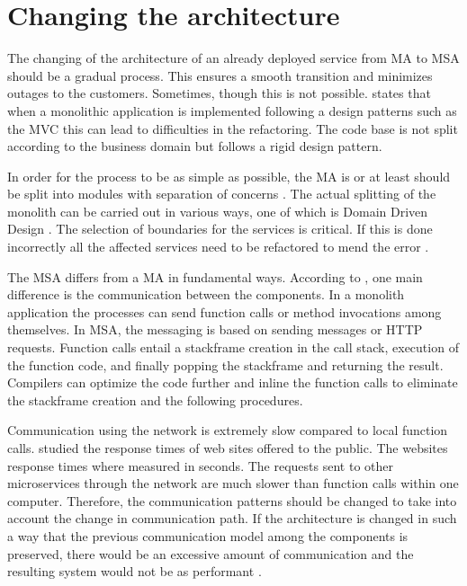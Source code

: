 \section{Changing the architecture}
\begin{sloppypar}
    The changing of the architecture of an already deployed service from MA to
    MSA should be a gradual process. This ensures a smooth transition and
    minimizes outages to the customers. Sometimes, though this is not possible.
    \citet{newman2019} states that when a monolithic application is implemented
    following a design patterns such as the MVC \citep{trygvemvc} this can lead
    to difficulties in the refactoring. The code base is not split according to
    the business domain but follows a rigid design pattern.
\end{sloppypar}
\begin{sloppypar}
    In order for the process to be as simple as possible, the MA is or at least
    should be split into modules with separation of concerns \citep{secchalmsa}.
    The actual splitting of the monolith can be carried out in various ways, one
    of which is Domain Driven Design \citep{evans2003}. The selection of
    boundaries for the services is critical. If this is done incorrectly all the
    affected services need to be refactored to mend the error
    \citep{newman2019}.
\end{sloppypar}
\begin{sloppypar}
    The MSA differs from a MA in fundamental ways. According to
    \citet{fowlerlewisms}, one main difference is the communication between the
    components. In a monolith application the processes can send function calls
    or method invocations among themselves. In MSA, the messaging is based on
    sending messages or HTTP requests. Function calls entail a stackframe
    creation in the call stack, execution of the function code, and finally
    popping the stackframe and returning the result. Compilers can optimize the
    code further and inline the function calls to eliminate the stackframe
    creation and the following procedures.
\end{sloppypar}
\begin{sloppypar}    
    Communication using the network is extremely slow compared to local function
    calls. \citet{webdelays} studied the response times of web sites offered to
    the public. The websites response times where measured in seconds. The
    requests sent to other microservices through the network are much slower
    than function calls within one computer. Therefore, the communication
    patterns should be changed to take into account the change in communication
    path. If the architecture is changed in such a way that the previous
    communication model among the components is preserved, there would be an
    excessive amount of communication and the resulting system would not be as
    performant \citep{fowlerlewisms}.
\end{sloppypar}


